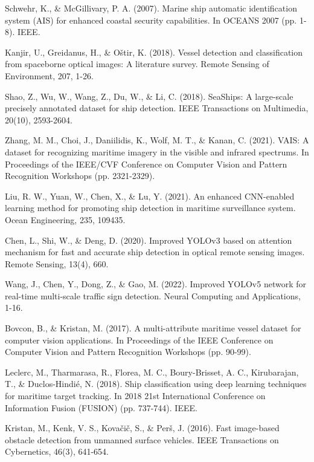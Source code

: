 \documentclass[twoside]{article}
\begin{document}
\begin{multicols}{2}
\begin{thebibliography}{99}
Schwehr, K., \& McGillivary, P. A. (2007). Marine ship automatic identification system (AIS) for enhanced coastal security capabilities. In OCEANS 2007 (pp. 1-8). IEEE.

Kanjir, U., Greidanus, H., \& Oštir, K. (2018). Vessel detection and classification from spaceborne optical images: A literature survey. Remote Sensing of Environment, 207, 1-26.

Shao, Z., Wu, W., Wang, Z., Du, W., \& Li, C. (2018). SeaShips: A large-scale precisely annotated dataset for ship detection. IEEE Transactions on Multimedia, 20(10), 2593-2604.

Zhang, M. M., Choi, J., Daniilidis, K., Wolf, M. T., \& Kanan, C. (2021). VAIS: A dataset for recognizing maritime imagery in the visible and infrared spectrums. In Proceedings of the IEEE/CVF Conference on Computer Vision and Pattern Recognition Workshops (pp. 2321-2329).

Liu, R. W., Yuan, W., Chen, X., \& Lu, Y. (2021). An enhanced CNN-enabled learning method for promoting ship detection in maritime surveillance system. Ocean Engineering, 235, 109435.

Chen, L., Shi, W., \& Deng, D. (2020). Improved YOLOv3 based on attention mechanism for fast and accurate ship detection in optical remote sensing images. Remote Sensing, 13(4), 660.

Wang, J., Chen, Y., Dong, Z., \& Gao, M. (2022). Improved YOLOv5 network for real-time multi-scale traffic sign detection. Neural Computing and Applications, 1-16.

Bovcon, B., \& Kristan, M. (2017). A multi-attribute maritime vessel dataset for computer vision applications. In Proceedings of the IEEE Conference on Computer Vision and Pattern Recognition Workshops (pp. 90-99).

Leclerc, M., Tharmarasa, R., Florea, M. C., Boury-Brisset, A. C., Kirubarajan, T., \& Duclos-Hindié, N. (2018). Ship classification using deep learning techniques for maritime target tracking. In 2018 21st International Conference on Information Fusion (FUSION) (pp. 737-744). IEEE.

Kristan, M., Kenk, V. S., Kovačič, S., \& Perš, J. (2016). Fast image-based obstacle detection from unmanned surface vehicles. IEEE Transactions on Cybernetics, 46(3), 641-654.


\end{thebibliography}
\end{multicols}
\end{document}
